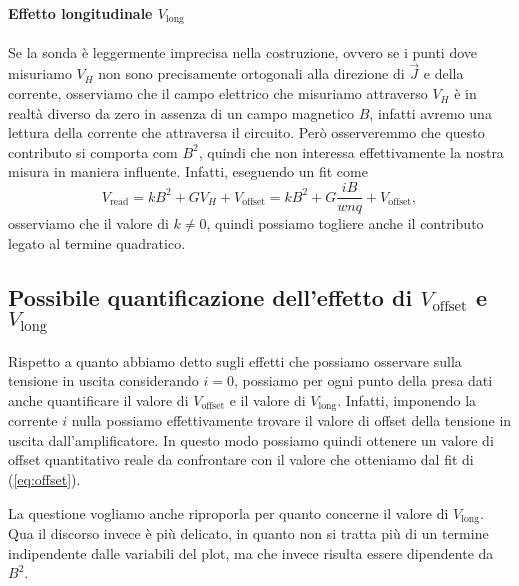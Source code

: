 \documentclass[fleqn,varvw,11pt,tightenlines]{memo}
\begin{document}
\paragraph{Effetto longitudinale $V_\text{long}$} Se la sonda è leggermente imprecisa nella costruzione, ovvero se i punti dove misuriamo $V_H$ non sono precisamente ortogonali alla direzione di $\vec{J}$ e della corrente, osserviamo che il campo elettrico che misuriamo attraverso $V_H$ è in realtà diverso da zero in assenza di un campo magnetico $B$, infatti avremo una lettura della corrente che attraversa il circuito. Però osserveremmo che questo contributo si comporta com $B^2$, quindi che non interessa effettivamente la nostra misura in maniera influente. Infatti, eseguendo un fit come \begin{equation}
    V_\text{read} = kB^2 +  GV_H + V_\text{offset} = kB^2 + G\frac{iB}{wnq} + V_\text{offset},
\end{equation} osserviamo che il valore di $k\neq0$, quindi possiamo togliere anche il contributo legato al termine quadratico. 

\subsection{Possibile quantificazione dell'effetto di $V_\text{offset}$ e $V_\text{long}$}
 Rispetto a quanto abbiamo detto sugli effetti che possiamo osservare sulla tensione in uscita considerando $i=0$, possiamo per ogni punto della presa dati anche quantificare il valore di $V_\text{offset}$ e il valore di $V_\text{long}$. 
Infatti, imponendo la corrente $i$ nulla possiamo effettivamente trovare il valore di offset della tensione in uscita dall'amplificatore. In questo modo possiamo quindi ottenere un valore di offset quantitativo reale da confrontare con il valore che otteniamo dal fit di (\ref{eq:offset}). 

La questione vogliamo anche riproporla per quanto concerne il valore di $V_\text{long}$. Qua il discorso invece è più delicato, in quanto non si tratta più di un termine indipendente dalle variabili del plot, ma che invece risulta essere dipendente da $B^2$.
\end{document}

